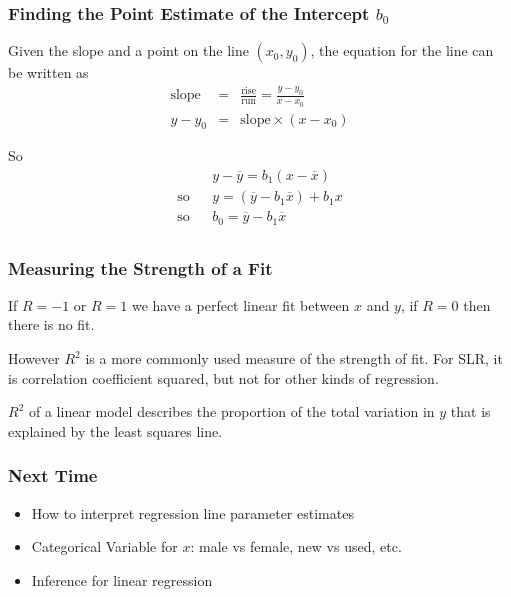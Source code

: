 \documentclass[handout]{beamer}
\newcommand{\blue}[1]{\textcolor{blue2}{#1}}
\newcommand{\xbar}{\overline{x}}
\newcommand{\ybar}{\overline{y}}
\begin{document}
\begin{frame}[fragile]
\frametitle{Finding the Point Estimate of the Intercept $b_0$}
%
%
Given the slope and a point on the line $(x_0, y_0)$, the equation for the line can be written as 
\begin{eqnarray*}
\mbox{slope} &=& \frac{\mbox{rise}}{\mbox{run}} = \frac{y-y_0}{x-x_0}\\
y-y_0 &=& \mbox{slope} \times (x-x_0)
\end{eqnarray*}

\pause So
\begin{eqnarray*}
&& y - \ybar = b_1(x - \xbar)\\
\mbox{so} && y = \left(\ybar - b_1\xbar\right) + b_1 x\\
\mbox{so} && b_0 = \ybar - b_1\xbar\\
\end{eqnarray*}

\end{frame}


\begin{frame}[fragile]
\frametitle{Measuring the Strength of a Fit}
If $R=-1$ or $R=1$ we have a perfect linear fit between $x$ and $y$, if $R=0$ then there is no fit.
\pause
\vspace{0.5cm}

However $R^2$ is a more commonly used measure of the strength of fit.  For SLR, it is correlation coefficient squared, but not for other kinds of regression.  
\pause

\vspace{0.5cm}
$R^2$ of a linear model describes the \blue{proportion of the total variation in $y$ that is explained by the least squares line}.

\end{frame}


\begin{frame}[fragile]
\frametitle{Next Time}

\begin{itemize}
\item How to interpret regression line parameter estimates
\item Categorical Variable for $x$:  male vs female, new vs used, etc.
\item Inference for linear regression
\end{itemize}

\end{frame}
\end{document}
